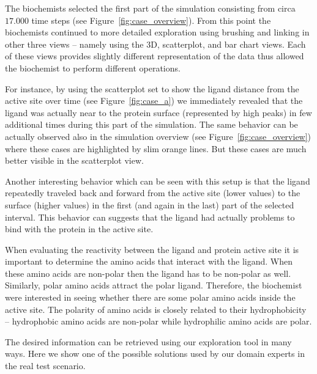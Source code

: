 \documentclass[twocolumn]{bmcart}%
\begin{document}
The biochemists selected the first part of the simulation consisting from circa $17.000$ time steps (see Figure~\ref{fig:case_overview}). 
From this point the biochemists continued to more detailed exploration using brushing and linking in other three views -- namely using the 3D, scatterplot, and bar chart views.
Each of these views provides slightly different representation of the data thus allowed the biochemist to perform different operations.

For instance, by using the scatterplot set to show the ligand distance from the active site over time (see Figure~\ref{fig:case_a}) we immediately revealed that the ligand was actually near to the protein surface (represented by high peaks) in few additional times during this part of the simulation.
The same behavior can be actually observed also in the simulation overview (see Figure~\ref{fig:case_overview}) where these cases are highlighted by slim orange lines. 
But these cases are much better visible in the scatterplot view.

Another interesting behavior which can be seen with this setup is that the ligand repeatedly traveled back and forward from the active site (lower values) to the surface (higher values) in the first (and again in the last) part of the selected interval.
This behavior can suggests that the ligand had actually problems to bind with the protein in the active site.

 
 


When evaluating the reactivity between the ligand and protein active site it is important to determine the amino acids that interact with the ligand. 
When these amino acids are non-polar then the ligand has to be non-polar as well.
Similarly, polar amino acids attract the polar ligand.
Therefore, the biochemist were interested in seeing whether there are some polar amino acids inside the active site.
The polarity of amino acids is closely related to their hydrophobicity -- hydrophobic amino acids are non-polar while hydrophilic amino acids are polar. 

The desired information can be retrieved using our exploration tool in many ways.
Here we show one of the possible solutions used by our domain experts in the real test scenario.
\end{document}
